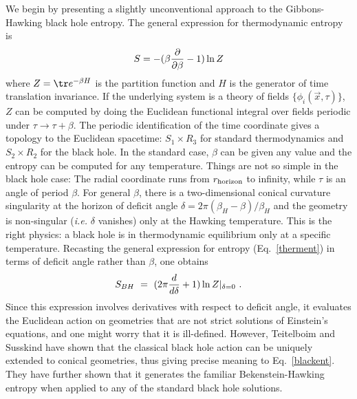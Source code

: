 \documentclass[12pt]{article}
\begin{document}
We begin by presenting a slightly unconventional approach to the
Gibbons-Hawking
black hole entropy. The general expression for thermodynamic entropy is
\begin{equation}
S = -(\beta {\partial \over \partial \beta} -1 ) \ln Z
\label{therment}
\end{equation}
where $Z = \tr e^{-\beta H}$ is the partition function and $H$ is the
generator of time translation invariance. If the underlying
system is a theory of fields $\{\phi_i(\vec x,\tau)\}$, $Z$ can be
computed by doing the Euclidean functional integral over fields
periodic under $\tau\to\tau+\beta$. The periodic identification of the time
coordinate gives a topology to the Euclidean spacetime: $S_1\times R_3$ for
standard thermodynamics and $S_2\times R_2$ for the black hole. In the standard
case, $\beta$ can be given any value and the entropy can be computed for
any temperature. Things are not so simple in the black hole case: The radial
coordinate runs from $r_{\rm horizon}$ to infinity, while $\tau$ is an angle
of period $\beta$. For general $\beta$, there is a two-dimensional conical
curvature singularity at the horizon of deficit angle $\delta= 2\pi
(\beta_H-\beta)/\beta_H$
and the geometry is non-singular ({\it i.e.} $\delta$ vanishes)
only at the Hawking temperature. This is the right physics: a black hole is in
thermodynamic equilibrium only at a specific temperature. Recasting the
general expression for entropy (Eq.~\ref{therment}) in terms of deficit angle
rather than $\beta$, one obtains
\begin{equation}
S_{BH}~=~ (2\pi{d \over d \delta} +1 ) \ln Z |_{\delta=0}~.
\label{blackent}
\end{equation}
Since this expression involves derivatives with respect to deficit angle, it
evaluates the Euclidean action on geometries that are not strict solutions of
Einstein's equations, and one might worry that it is ill-defined. However,
Teitelboim\cite{claudio} and Susskind\cite{lenny} have shown that the classical
black hole action can be uniquely extended to conical geometries, thus giving
precise
meaning to Eq.~\ref{blackent}. They have further shown that it generates
  the familiar Bekenstein-Hawking entropy when applied to any of the standard
black hole solutions.
\end{document}
